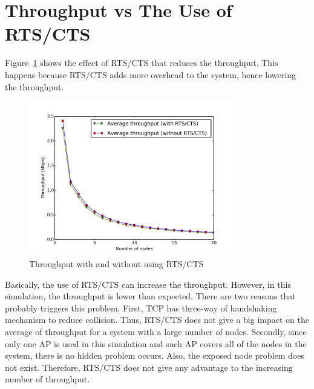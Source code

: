 \section{Throughput vs The Use of RTS/CTS}

Figure~\ref{fig:rts-cts-combine} shows the effect of RTS/CTS that reduces the throughput. This happens because RTS/CTS adds more overhead to the system, hence lowering the throughput.

\begin{figure}[H]
    \centering
    \includegraphics[width=0.8\textwidth]{figures/rts-cts-combine}
    \caption{Throughput with and without using RTS/CTS}
    \label{fig:rts-cts-combine}
\end{figure}

Basically, the use of RTS/CTS can increase the throughput. However, in this simulation, the throughput is lower than expected. There are two reasons that probably triggers this problem. First, TCP has three-way of handshaking mechanism to reduce collision. Thus, RTS/CTS does not give a big impact on the average of throughput for a system with a large number of nodes. Secondly, since only one AP is used in this simulation and such AP covers all of the nodes in the system, there is no hidden problem occurs. Also, the exposed node problem does not exist. Therefore, RTS/CTS does not give any advantage to the increasing number of throughput.